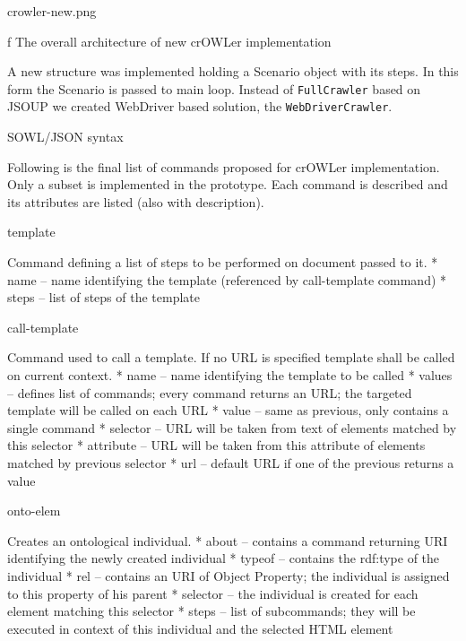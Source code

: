 \midinsert {}
\picw=12cm \cinspic crowler-new.png
\caption/f The overall architecture of new crOWLer implementation
\endinsert

%

A new structure was implemented holding a Scenario object with its steps.  In
this form the Scenario is passed to main loop. Instead of {\tt FullCrawler}
based on JSOUP we created WebDriver based solution, the {\tt WebDriverCrawler}. 


\sec SOWL/JSON syntax

Following is the final list of commands proposed for crOWLer implementation.
Only a subset is implemented in the prototype. Each command is described and
its attributes are listed (also with description). 


\secc template %

Command defining a list of steps to be performed on document passed to it. 
\begitems
  * name -- name identifying the template (referenced by call-template command)
  * steps -- list of steps of the template
\enditems


\secc call-template %

Command used to call a template. If no URL is specified template shall be
called on current context. 
\begitems
  * name -- name identifying the template to be called
  * values -- defines list of commands; every command returns an URL;
    the targeted template will be called on each URL
  * value -- same as previous, only contains a single command
  * selector -- URL will be taken from text of elements matched by this selector
  * attribute -- URL will be taken from this attribute of elements matched by previous selector
  * url -- default URL if one of the previous returns a value 
\enditems


\secc onto-elem

Creates an ontological individual. 
\begitems
  * about -- contains a command returning URI identifying the newly created individual
  * typeof -- contains the rdf:type of the individual
  * rel -- contains an URI of Object Property; the individual is assigned to this property of his parent
  * selector -- the individual is created for each element matching this selector
  * steps -- list of subcommands; they will be executed in context of this individual
            and the selected HTML element
\enditems


